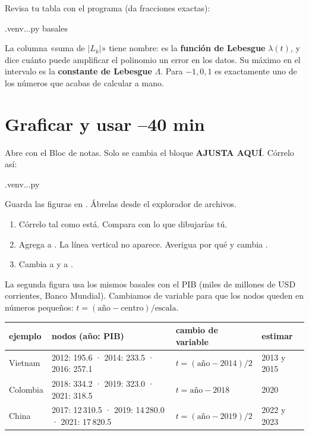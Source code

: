 \begin{preguntas}
\end{preguntas}
Revisa tu tabla con el programa (da fracciones exactas):
\begin{orden}
.venv\Scripts\python ..\docs\curso{}\experimentos.py basales
\end{orden}
La columna «suma de $|L_k|$» tiene nombre: es la \textbf{función de Lebesgue} $\lambda(t)$, y dice cuánto puede amplificar el polinomio un error en los datos. Su máximo en el intervalo es la \textbf{constante de Lebesgue} $\Lambda$. Para $-1, 0, 1$ es exactamente uno de los números que acabas de calcular a mano.

\section{Graficar y usar \hfill\small{}–40 min}
Abre  con el Bloc de notas. Solo se cambia el bloque \textbf{AJUSTA AQUÍ}. Córrelo así:
\begin{orden}
.venv\Scripts\python ..\docs\curso{}\graficar.py
\end{orden}
Guarda las figuras en . Ábrelas desde el explorador de archivos.
\begin{enumerate}
\item Córrelo tal como está. Compara  con lo que dibujarías tú.
\item Agrega  a . La línea vertical no aparece. Averigua por qué y cambia .
\item Cambia  a \codigo{[0, 1, 3]} y  a \codigo{[2]}.
\end{enumerate}
La segunda figura usa los mismos basales con el PIB (miles de millones de USD corrientes, Banco Mundial). Cambiamos de variable para que los nodos queden en números pequeños: $t = (\text{año}-\text{centro})/\text{escala}$.

{\small
\begin{tabularx}{\linewidth}{lXll}
\toprule
\textbf{ejemplo} & \textbf{nodos (año: PIB)} & \textbf{cambio de variable} & \textbf{estimar} \\
\midrule
Vietnam & 2012: 195.6 · 2014: 233.5 · 2016: 257.1 & $t=(\text{año}-2014)/2$ & 2013 y 2015 \\
Colombia & 2018: 334.2 · 2019: 323.0 · 2021: 318.5 & $t=\text{año}-2018$ & 2020 \\
China & 2017: 12\,310.5 · 2019: 14\,280.0 · 2021: 17\,820.5 & $t=(\text{año}-2019)/2$ & 2022 y 2023 \\
\bottomrule
\end{tabularx}}


